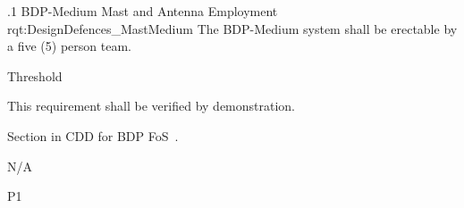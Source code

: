 
\ONERQMTVKSA
{\RqtNumberBase.1}
{BDP-Medium Mast and Antenna Employment}
{rqt:DesignDefences_MastMedium}
{The BDP-Medium system shall be erectable by a five (5) person team.}
{
	\item [Phase 1] Threshold
}
{This requirement shall be verified by demonstration.}
{
\item [5.5.17.1] Section in CDD for BDP FoS~\cite{ref__BDP_FOS_CDD}.
}
{
	\item N/A
}
{P1}
